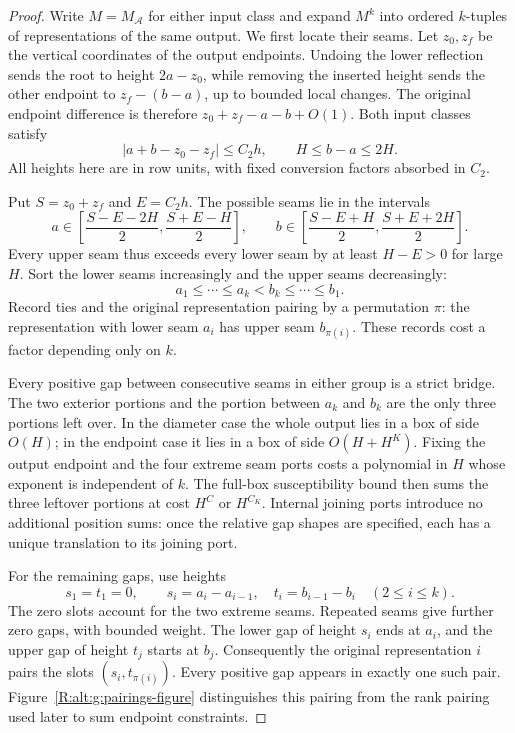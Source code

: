 \begin{proof}
Write $M=M_{\mathcal A}$ for either input class and expand $M^k$ into
ordered $k$-tuples of representations of the same output. We first
locate their seams. Let $z_0,z_f$ be the vertical coordinates of the
output endpoints. Undoing the lower reflection sends the root to height
$2a-z_0$, while removing the inserted height sends the other endpoint to
$z_f-(b-a)$, up to bounded local changes. The original endpoint difference
is therefore $z_0+z_f-a-b+O(1)$. Both input classes satisfy
\begin{equation}\label{R:alt:g:seam-sum}
 |a+b-z_0-z_f|\le C_2h,\qquad H\le b-a\le2H.
\end{equation}
All heights here are in row units, with fixed conversion factors absorbed
in $C_2$.

Put $S=z_0+z_f$ and $E=C_2h$. The possible seams lie in the intervals
\[
 a\in\left[\frac{S-E-2H}{2},\frac{S+E-H}{2}\right],\qquad
 b\in\left[\frac{S-E+H}{2},\frac{S+E+2H}{2}\right].
\]
Every upper seam thus exceeds every lower seam by at least $H-E>0$
for large $H$. Sort the lower seams increasingly and the upper seams
decreasingly:
\[
 a_1\le\cdots\le a_k<b_k\le\cdots\le b_1.
\]
Record ties and the original representation pairing by a permutation
$\pi$: the representation with lower seam $a_i$ has upper seam
$b_{\pi(i)}$. These records cost a factor depending only on $k$.

Every positive gap between consecutive seams in either group is a strict
bridge. The two exterior portions and the portion between $a_k$ and $b_k$
are the only three portions left over. In the diameter case the whole
output lies in a box of side $O(H)$; in the endpoint case it lies in a box
of side $O(H+H^K)$. Fixing the output endpoint and the four extreme seam
ports costs a polynomial in $H$ whose exponent is independent of $k$.
The full-box susceptibility bound then sums the three leftover portions
at cost $H^C$ or $H^{C_K}$. Internal joining ports introduce no additional
position sums: once the relative gap shapes are specified, each has a
unique translation to its joining port.

For the remaining gaps, use heights
\[
 s_1=t_1=0,\qquad
 s_i=a_i-a_{i-1},\quad t_i=b_{i-1}-b_i\quad(2\le i\le k).
\]
The zero slots account for the two extreme seams. Repeated seams give
further zero gaps, with bounded weight. The lower gap of height $s_i$
ends at $a_i$, and the upper gap of height $t_j$ starts at $b_j$.
Consequently the original representation $i$ pairs the slots
$(s_i,t_{\pi(i)})$. Every positive gap appears in exactly one such pair.
Figure~\ref{R:alt:g:pairings-figure} distinguishes this pairing from the
rank pairing used later to sum endpoint constraints.


\end{proof}
